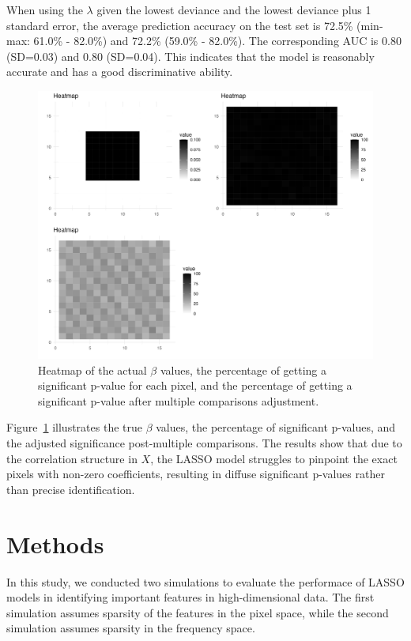 \documentclass[12pt]{article}
\begin{document}
When using the \(\lambda\) given the lowest deviance and the lowest deviance plus 1 standard error, the average prediction accuracy on the test set is 72.5\% (min-max: 61.0\% - 82.0\%) and 72.2\% (59.0\% - 82.0\%). The corresponding AUC is 0.80 (SD=0.03) and 0.80 (SD=0.04). This indicates that the model is reasonably accurate and has a good discriminative ability.

\begin{figure}[H]
    \centering
    \includegraphics[width=\textwidth]{../Figures/sim1_heatmap.png}
    \caption{Heatmap of the actual \(\beta\) values, the percentage of getting a significant p-value for each pixel, and the percentage of getting a significant p-value after multiple comparisons adjustment.}
    \label{fig:sim1_heatmap}
\end{figure}

Figure~\ref{fig:sim1_heatmap} illustrates the true \(\beta\) values, the percentage of significant p-values, and the adjusted significance post-multiple comparisons. The results show that due to the correlation structure in \( X \), the LASSO model struggles to pinpoint the exact pixels with non-zero coefficients, resulting in diffuse significant p-values rather than precise identification.


\clearpage

\section*{Methods}

In this study, we conducted two simulations to evaluate the performace of LASSO models in identifying important features in high-dimensional data. The first simulation assumes sparsity of the features in the pixel space, while the second simulation assumes sparsity in the frequency space.
\end{document}
